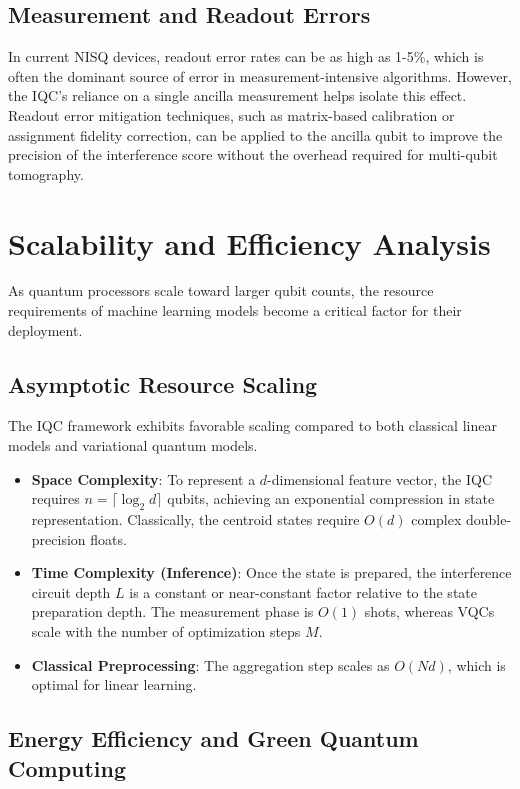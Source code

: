 \documentclass[conference]{IEEEtran}
\begin{document}
\subsection{Measurement and Readout Errors}

In current NISQ devices, readout error rates can be as high as 1-5\%, which is often the dominant source of error in measurement-intensive algorithms. However, the IQC's reliance on a single ancilla measurement helps isolate this effect. Readout error mitigation techniques, such as matrix-based calibration or assignment fidelity correction, can be applied to the ancilla qubit to improve the precision of the interference score without the overhead required for multi-qubit tomography.

\section{Scalability and Efficiency Analysis}

As quantum processors scale toward larger qubit counts, the resource requirements of machine learning models become a critical factor for their deployment.

\subsection{Asymptotic Resource Scaling}

The IQC framework exhibits favorable scaling compared to both classical linear models and variational quantum models. 
\begin{itemize}
    \item \textbf{Space Complexity}: To represent a $d$-dimensional feature vector, the IQC requires $n = \lceil \log_2 d \rceil$ qubits, achieving an exponential compression in state representation. Classically, the centroid states require $O(d)$ complex double-precision floats.
    \item \textbf{Time Complexity (Inference)}: Once the state is prepared, the interference circuit depth $L$ is a constant or near-constant factor relative to the state preparation depth. The measurement phase is $O(1)$ shots, whereas VQCs scale with the number of optimization steps $M$.
    \item \textbf{Classical Preprocessing}: The aggregation step scales as $O(Nd)$, which is optimal for linear learning.
\end{itemize}

\subsection{Energy Efficiency and Green Quantum Computing}
\end{document}
